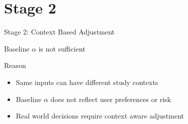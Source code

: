\section{Stage 2}
\begin{frame}{Stage 2: Context Based Adjustment}
	
	\begin{block}
		
	Baseline $\alpha$ is not sufficient
		
	\end{block}
	
	\vspace{0.4cm}
	
	\begin{exampleblock}{Reason}
		
		\begin{itemize}
			\item Same inputs can have different study contexts
			\item Baseline $\alpha$ does not reflect user preferences or risk
			\item Real world decisions require context aware adjustment
		\end{itemize}
		
	\end{exampleblock}
	
\end{frame}

